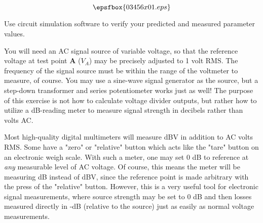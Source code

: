 

$$\epsfbox{03456x01.eps}$$

\vfil \eject






Use circuit simulation software to verify your predicted and measured parameter values.







You will need an AC signal source of variable voltage, so that the reference voltage at test point {\bf A} ($V_A$) may be precisely adjusted to 1 volt RMS.  The frequency of the signal source must be within the range of the voltmeter to measure, of course.  You may use a sine-wave signal generator as the source, but a step-down transformer and series potentiometer works just as well!  The purpose of this exercise is not how to calculate voltage divider outputs, but rather how to utilize a dB-reading meter to measure signal strength in decibels rather than volts AC.

Most high-quality digital multimeters will measure dBV in addition to AC volts RMS.  Some have a "zero" or "relative" button which acts like the "tare" button on an electronic weigh scale.  With such a meter, one may set 0 dB to reference at {\it any} measurable level of AC voltage.  Of course, this means the meter will be measuring dB instead of dBV, since the reference point is made arbitrary with the press of the "relative" button.  However, this is a very useful tool for electronic signal measurements, where source strength may be set to 0 dB and then losses measured directly in -dB (relative to the source) just as easily as normal voltage measurements.




